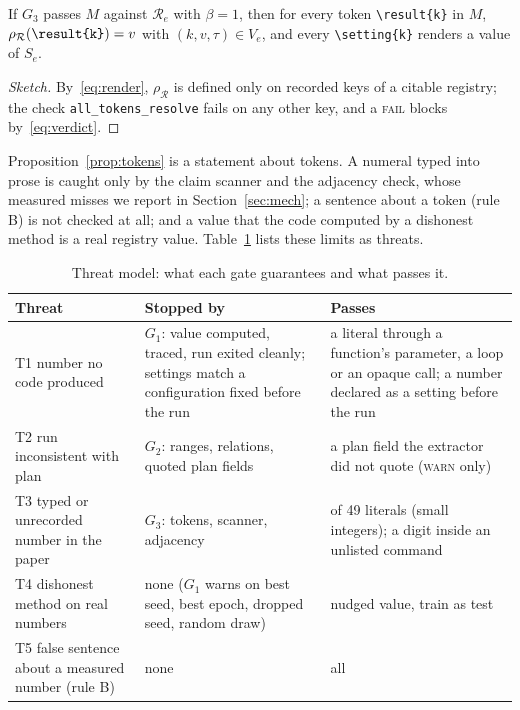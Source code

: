 \documentclass[sigconf,anonymous]{aamas}
\newcommand{\Reg}{\mathcal{R}}
\newcommand{\Man}{M}
\newcommand{\fail}{\textsc{fail}}
\newcommand{\warn}{\textsc{warn}}
\begin{document}
\begin{proposition}
\label{prop:tokens}
If $G_3$ passes $\Man$ against $\Reg_e$ with $\beta = 1$, then for every token \verb|\result{k}| in $\Man$, $\rho_{\Reg}(\verb|\result{k}|) = v$ with $(k, v, \tau) \in V_e$, and every \verb|\setting{k}| renders a value of $S_e$.
\end{proposition}

\begin{proof}[Sketch]
By~\eqref{eq:render}, $\rho_{\Reg}$ is defined only on recorded keys of a citable registry; the check \texttt{all\_tokens\_\allowbreak resolve} fails on any other key, and a \fail{} blocks by~\eqref{eq:verdict}.
\end{proof}

Proposition~\ref{prop:tokens} is a statement about tokens.
A numeral typed into prose is caught only by the claim scanner and the adjacency check, whose measured misses we report in Section~\ref{sec:mech}; a sentence about a token (rule B) is not checked at all; and a value that the code computed by a dishonest method is a real registry value.
Table~\ref{tab:threats} lists these limits as threats.

\begin{table}[t]
\caption{Threat model: what each gate guarantees and what passes it.}
\label{tab:threats}
\footnotesize
\begin{tabular}{@{}>{\raggedright\arraybackslash}p{}>{\raggedright\arraybackslash}p{}>{\raggedright\arraybackslash}p{}@{}}
\toprule
Threat & Stopped by & Passes \\
\midrule
T1 number no code produced & $G_1$: value computed, traced, run exited cleanly; settings match a configuration fixed before the run & a literal through a function's parameter, a loop or an opaque call; a number declared as a setting before the run \\
T2 run inconsistent with plan & $G_2$: ranges, relations, quoted plan fields & a plan field the extractor did not quote (\warn{} only) \\
T3 typed or unrecorded number in the paper & $G_3$: tokens, scanner, adjacency & 2 of 49 literals (small integers); a digit inside an unlisted command \\
T4 dishonest method on real numbers & none ($G_1$ warns on best seed, best epoch, dropped seed, random draw) & nudged value, train as test \\
T5 false sentence about a measured number (rule B) & none & all \\
\bottomrule
\end{tabular}
\end{table}
\end{document}
